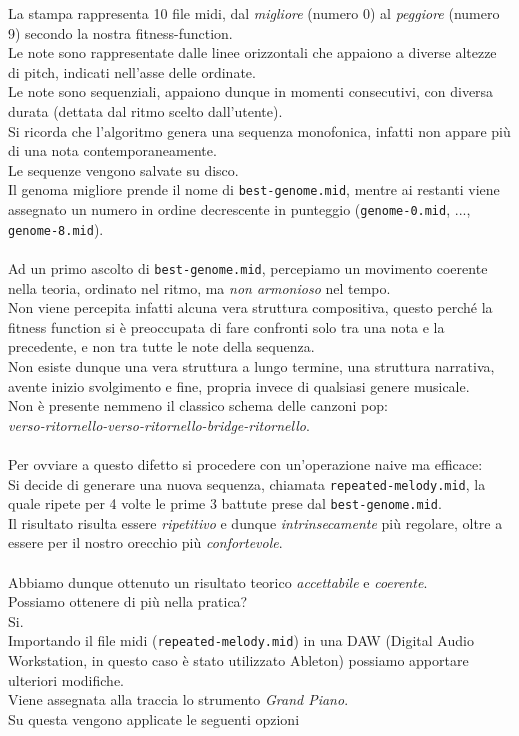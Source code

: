 \documentclass[a4paper,12pt]{report}
\begin{document}
La stampa rappresenta 10 file midi, dal \textit{migliore} (numero 0) al \textit{peggiore} (numero 9) secondo la nostra fitness-function. \\
Le note sono rappresentate dalle linee orizzontali che appaiono a diverse altezze di pitch, indicati nell'asse delle ordinate. \\
Le note sono sequenziali, appaiono dunque in momenti consecutivi, con diversa durata (dettata dal ritmo scelto dall'utente). \\
Si ricorda che l'algoritmo genera una sequenza monofonica, infatti non appare più di una nota contemporaneamente. \\
Le sequenze vengono salvate su disco. \\
Il genoma migliore prende il nome di \texttt{best-genome.mid}, mentre ai restanti viene assegnato un numero in ordine decrescente in punteggio (\texttt{genome-0.mid}, ..., \texttt{genome-8.mid}). \\
\\
Ad un primo ascolto di \texttt{best-genome.mid}, percepiamo un movimento coerente nella teoria, ordinato nel ritmo, ma \textit{non armonioso} nel tempo. \\
Non viene percepita infatti alcuna vera struttura compositiva, questo perché la fitness function si è preoccupata di fare confronti solo tra una nota e la precedente, e non tra tutte le note della sequenza. \\
Non esiste dunque una vera struttura a lungo termine, una struttura narrativa, avente inizio svolgimento e fine, propria invece di qualsiasi genere musicale. \\
Non è presente nemmeno il classico schema delle canzoni pop: \\
\textit{verso-ritornello-verso-ritornello-bridge-ritornello}. \\
\\
Per ovviare a questo difetto si procedere con un'operazione naive ma efficace: \\
Si decide di generare una nuova sequenza, chiamata \texttt{repeated-melody.mid}, la quale ripete per 4 volte le prime 3 battute prese dal \texttt{best-genome.mid}. \\
Il risultato risulta essere \textit{ripetitivo} e dunque \textit{intrinsecamente} più regolare, oltre a essere per il nostro orecchio più \textit{confortevole}. \\
\\
Abbiamo dunque ottenuto un risultato teorico \textit{accettabile} e \textit{coerente}. \\
Possiamo ottenere di più nella pratica? \\
Si. \\
Importando il file midi (\texttt{repeated-melody.mid}) in una DAW (Digital Audio Workstation, in questo caso è stato utilizzato Ableton) possiamo apportare ulteriori modifiche. \\
Viene assegnata alla traccia lo strumento \textit{Grand Piano}. \\
Su questa vengono applicate le seguenti opzioni
\end{document}
